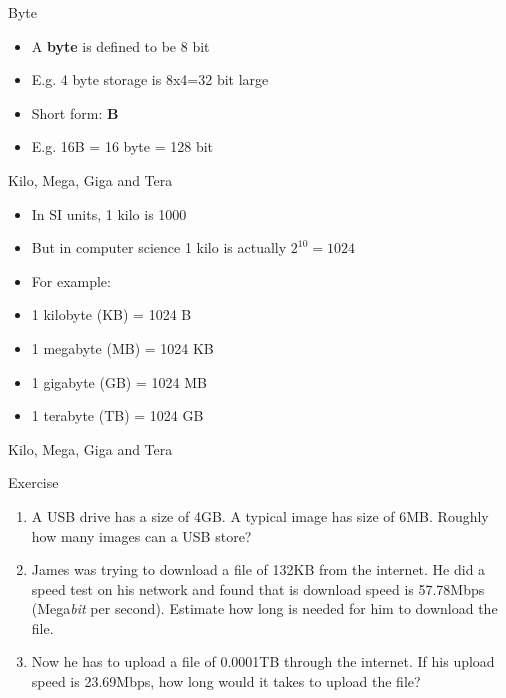 \documentclass[10pt,xcolor={table,dvipsnames},t]{beamer}
\begin{document}
\begin{frame}{Byte}
  \begin{itemize}
    \item A \textbf{byte} is defined to be 8 bit 
    \item E.g. 4 byte storage is 8x4=32 bit large
    \item Short form: \textbf{B}
    \item E.g. 16B = 16 byte = 128 bit
  \end{itemize}
\end{frame}

\begin{frame}{Kilo, Mega, Giga and Tera}

  \begin{itemize}
    \item In SI units, 1 kilo is 1000
    \item But in computer science 1 kilo is actually $2^{10} = 1024$
    \item For example:
    \item 1 kilobyte (KB) = 1024 B
    \item 1 megabyte (MB) = 1024 KB
    \item 1 gigabyte (GB) = 1024 MB
    \item 1 terabyte (TB) = 1024 GB
  \end{itemize}
\end{frame}

\begin{frame}{Kilo, Mega, Giga and Tera}
  \begin{exampleblock}{Exercise}
    \begin{enumerate}
      \item A USB drive has a size of 4GB. A typical image has size of 6MB. Roughly how many images can a USB store?
      \item James was trying to download a file of 132KB from the internet. He did a speed test on his network and found that is download speed is 57.78Mbps (Mega\textit{bit} per second). Estimate how long is needed for him to download the file.
      \item Now he has to upload a file of 0.0001TB through the internet. If his upload speed is 23.69Mbps, how long would it takes to upload the file?
    \end{enumerate}
  \end{exampleblock}
\end{frame}
\end{document}
